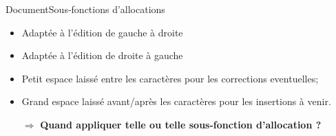 \begin{frame}{Document}{Sous-fonctions d'allocations}
  
  \begin{minipage}{0.45\textwidth}
    \begin{center}
      
    \end{center}
  \end{minipage}
  \hfill
  \begin{minipage}{0.45\textwidth}
    \begin{center}
      
    \end{center}
  \end{minipage}

  \vspace{0.15cm}

  \begin{minipage}{0.45\textwidth}
    \begin{itemize}
    \item Adaptée à l'édition de gauche à droite
    \end{itemize}
  \end{minipage}
  \hfill
  \begin{minipage}{0.45\textwidth}
    \begin{itemize}
    \item Adaptée à l'édition de droite à gauche
    \end{itemize}
  \end{minipage}

  \vspace{0.5cm}
  
  \begin{itemize}
  \item Petit espace laissé entre les caractères pour les corrections eventuelles;
  \item Grand espace laissé avant/après les caractères pour les insertions à venir.
  \end{itemize}
  
  \vspace{0.5cm}
  \large
  \begin{itemize}
  \item [$\Rightarrow$] \textbf{Quand appliquer telle ou telle sous-fonction
      d'allocation ?}
  \end{itemize}

\end{frame}


